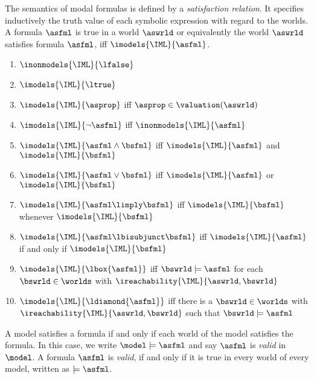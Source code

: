             \begin{definition}
                The semantics of modal formulas is defined by a \emph{satisfaction relation}.
                It specifies inductively the truth value of each symbolic expression with regard to the worlds. A formula $\asfml$ is true in a world $\aswrld$ or equivalently the world $\aswrld$ satisfies formula $\asfml$, iff $\imodels{\IML}{\asfml}$.
                \begin{enumerate}
                    \item $\inonmodels{\IML}{\lfalse}$
                    \item $\imodels{\IML}{\ltrue}$
                    \item $\imodels{\IML}{\asprop}$ iff $\asprop\in \valuation(\aswrld)$
                    \item $\imodels{\IML}{\lnot\asfml}$ iff $\inonmodels{\IML}{\asfml}$
                    \item $\imodels{\IML}{\asfml\land\bsfml}$ iff $\imodels{\IML}{\asfml}$ and $\imodels{\IML}{\bsfml}$
                    \item $\imodels{\IML}{\asfml\lor\bsfml}$ iff $\imodels{\IML}{\asfml}$ or $\imodels{\IML}{\bsfml}$
                    \item $\imodels{\IML}{\asfml\limply\bsfml}$ iff $\imodels{\IML}{\bsfml}$ whenever $\imodels{\IML}{\bsfml}$
                    \item $\imodels{\IML}{\asfml\lbisubjunct\bsfml}$ iff $\imodels{\IML}{\asfml}$ if and only if $\imodels{\IML}{\bsfml}$
                    \item $\imodels{\IML}{\lbox{\asfml}}$ iff $\bswrld\models\asfml$ for each $\bswrld\in\worlds$ with $\ireachability{\IML}{\aswrld,\bswrld}$
                    \item $\imodels{\IML}{\ldiamond{\asfml}}$ iff there is a $\bswrld\in\worlds$ with $\ireachability{\IML}{\aswrld,\bswrld}$ such that $\bswrld\models\asfml$
                \end{enumerate}
                A model satisfies a formula if and only if each world of the model satisfies the formula. In this case, we write $\model\models\asfml$ and say $\asfml$ is \emph{valid} in $\model$.
                A formula $\asfml$ is \emph{valid}, if and only if it is true in every world of every model, written as $\models\asfml$.
            \end{definition}

